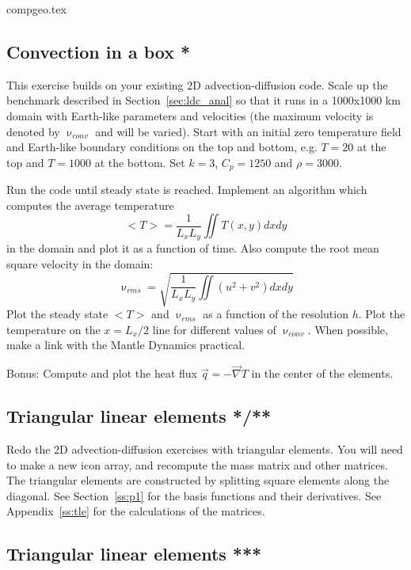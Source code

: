 \begin{flushright} {\tiny {\color{gray} compgeo.tex}} \end{flushright}

\subsection{Convection in a box *}

This exercise builds on your existing 2D advection-diffusion code. 
Scale up the benchmark described in Section~\ref{sec:ldc_anal} so that 
it runs in a 1000x1000 km domain with Earth-like parameters and velocities
(the maximum velocity is denoted by $\upnu_{conv}$ and will be varied).
Start with an initial zero temperature field and Earth-like boundary conditions 
on the top and bottom, e.g. $T=20$ at the top and $T=1000$ at the bottom. 
Set $k=3$, $C_p=1250$ and $\rho=3000$.

Run the code until steady state is reached. Implement an algorithm which computes the average 
temperature 
\[
<T> = \frac{1}{L_xL_y} \iint T(x,y) dx dy
\]
in the domain and plot it as a function of time.
Also compute the root mean square velocity in the domain:
\[
\upnu_{rms} = \sqrt{   \frac{1}{L_xL_y} \iint (u^2+v^2) dx dy  }
\]
Plot the steady state $<T>$ and $\upnu_{rms} $ as a function of the resolution $h$. 
Plot the temperature on the $x=L_x/2$ line for different values 
of $\upnu_{conv}$.
When possible, make a link with the Mantle Dynamics practical. 

Bonus: Compute and plot the heat flux $\vec{q}=-\vec\nabla T$ in the center of the elements.

\subsection{Triangular linear elements */**}

Redo the 2D advection-diffusion exercises with triangular elements.
You will need to make a new icon array, and recompute the mass matrix 
and other matrices. The triangular elements are constructed by splitting 
square elements along the diagonal.
See Section~\ref{ss:p1} for the basis functions and their derivatives.
See Appendix~\ref{ss:tle} for the calculations of the matrices.  

\subsection{Triangular linear elements ***}


